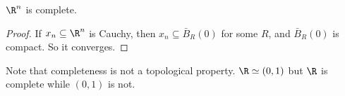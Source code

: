 \documentclass[a4paper]{article}
\begin{document}
\begin{cor}
  $\R^n$ is complete.
\end{cor}

\begin{proof}
  If $x_n \subseteq \R^n$ is Cauchy, then $x_n \subseteq \bar B_R (0) $ for some $R$, and $\bar{B}_R(0)$ is compact. So it converges.
\end{proof}

Note that completeness is not a topological property. $\R\simeq (0, 1)$ but $\R$ is complete while $(0, 1)$ is not.
\end{document}
